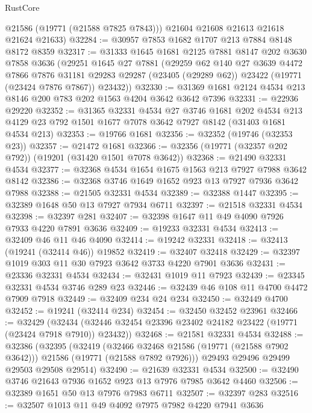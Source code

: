\begin{lexlean}{RustCore}
\begin{coremodule}
        @21586
        (@19771 (@21588 @7825 @7843)))
      @21604
      @21608
      @21613
      @21618
      @21624
      @21633)
@32284 := @30957 @7853 @1682 @1707 @213 @7884 @8148 @8172 @8359
@32317 := @31333
    @1645
    @1681
    @2125
    @7881
    @8147
    @202
    @3630
    @7858
    @3636
    (@29251
      @1645
      @27
      @7881
      (@29259
        @62
        @140
        @27
        @3639
        @4472
        @7866
        @7876
        @31181
        @29283
        @29287
        (@23405 (@29289 @62))
        @23422
        (@19771 (@23424 @7876 @7867))
        @23432))
@32330 := @31369 @1681 @2124 @4534 @213 @8146 @200 @783 @202 @1563 @4204 @3642 @3642 @7396
@32331 := @22936 @29220
@32352 := @31365
    @32331
    @4534
    @27
    @3746
    @1681
    @202
    @4534
    @213
    @4129
    @23
    @792
    @1501
    @1677
    @7078
    @3642
    @7927
    @8142
    (@31403 @1681 @4534 @213)
@32353 := @19766 @1681
@32356 := @32352 (@19746 (@32353 @23))
@32357 := @21472 @1681
@32366 := @32356 (@19771 (@32357 @202 @792)) (@19201 (@31420 @1501 @7078 @3642))
@32368 := @21490 @32331 @4534
@32377 := @32368 @4534 @1654 @1675 @1563 @213 @7927 @7988 @3642 @8142
@32386 := @32368 @3746 @1649 @1652 @923 @13 @7927 @7936 @3642 @7988
@32388 := @21505 @32331 @4534
@32389 := @32388 @1447
@32395 := @32389 @1648 @50 @13 @7927 @7934 @6711
@32397 := @21518 @32331 @4534
@32398 := @32397 @281
@32407 := @32398 @1647 @11 @49 @4090 @7926 @7933 @4220 @7891 @3636
@32409 := @19233 @32331 @4534
@32413 := @32409 @46 @11 @46 @4090
@32414 := @19242 @32331
@32418 := @32413 (@19241 (@32414 @46)) @19852
@32419 := @32407 @32418
@32429 := @32397 @1019 @303 @11 @30 @7923 @3642 @3733 @4220 @7901 @3636
@32431 := @23336 @32331 @4534
@32434 := @32431 @1019 @11 @7923
@32439 := @23345 @32331 @4534 @3746 @289 @23
@32446 := @32439 @46 @108 @11 @4700 @4472 @7909 @7918
@32449 := @32409 @234 @24 @234
@32450 := @32449 @4700
@32452 := @19241 (@32414 @234)
@32454 := @32450 @32452 @23961
@32466 := @32429
    (@32434 (@32446 @32454 @23396 @23402 @24182 @23422 (@19771 (@23424 @7918 @7910)) @23432))
@32468 := @21581 @32331 @4534
@32488 := @32386
    (@32395
      (@32419
        (@32466 @32468 @21586 (@19771 (@21588 @7902 @3642)))
        @21586
        (@19771 (@21588 @7892 @7926)))
      @29493
      @29496
      @29499
      @29503
      @29508
      @29514)
@32490 := @21639 @32331 @4534
@32500 := @32490 @3746 @21643 @7936 @1652 @923 @13 @7976 @7985 @3642 @4460
@32506 := @32389 @1651 @50 @13 @7976 @7983 @6711
@32507 := @32397 @283
@32516 := @32507 @1013 @11 @49 @4092 @7975 @7982 @4220 @7941 @3636

\end{coremodule}
\end{lexlean}
